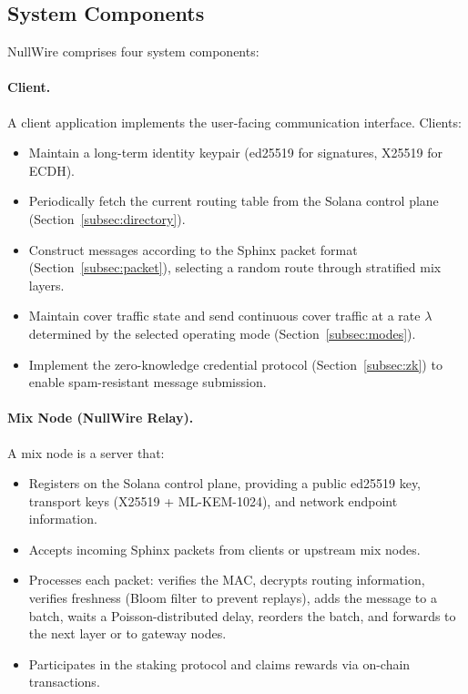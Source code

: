 \documentclass[11pt]{article}
\theoremstyle{definition}
\theoremstyle{remark}
\begin{document}
\subsection{System Components}

NullWire comprises four system components:

\paragraph{Client.} A client application implements the user-facing communication interface. Clients:
\begin{itemize}
    \item Maintain a long-term identity keypair (ed25519 for signatures, X25519 for ECDH).
    \item Periodically fetch the current routing table from the Solana control plane (Section~\ref{subsec:directory}).
    \item Construct messages according to the Sphinx packet format (Section~\ref{subsec:packet}), selecting a random route through stratified mix layers.
    \item Maintain cover traffic state and send continuous cover traffic at a rate $\lambda$ determined by the selected operating mode (Section~\ref{subsec:modes}).
    \item Implement the zero-knowledge credential protocol (Section~\ref{subsec:zk}) to enable spam-resistant message submission.
\end{itemize}

\paragraph{Mix Node (NullWire Relay).} A mix node is a server that:
\begin{itemize}
    \item Registers on the Solana control plane, providing a public ed25519 key, transport keys (X25519 + ML-KEM-1024), and network endpoint information.
    \item Accepts incoming Sphinx packets from clients or upstream mix nodes.
    \item Processes each packet: verifies the MAC, decrypts routing information, verifies freshness (Bloom filter to prevent replays), adds the message to a batch, waits a Poisson-distributed delay, reorders the batch, and forwards to the next layer or to gateway nodes.
    \item Participates in the staking protocol and claims rewards via on-chain transactions.
\end{itemize}
\end{document}
